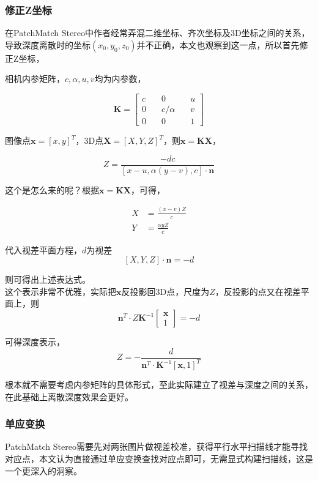 \subsubsection*{修正Z坐标}

在PatchMatch Stereo中作者经常弄混二维坐标、齐次坐标及3D坐标之间的关系，导致深度离散时的坐标$(x_0,y_0,z_0)$并不正确，本文也观察到这一点，所以首先修正Z坐标，

相机内参矩阵，$c,\alpha,u,v$均为内参数，

$$
	\mathbf{K} = \begin{bmatrix}
		c\quad& 0\quad& u\\
		0\quad& c/\alpha\quad& v\\
		0\quad& 0\quad& 1
	\end{bmatrix}
$$

图像点$\mathbf{x}=[x,y]^T$，3D点$\mathbf{X}=[X,Y,Z]^T$，则$\mathbf{x} = \mathbf{K}\mathbf{X}$，

$$
	Z = \frac{-dc}{[x-u,\alpha(y-v),c]\cdot\mathbf{n}}
$$

这个是怎么来的呢？根据$\mathbf{x} = \mathbf{K}\mathbf{X}$，可得，

\begin{align*}
	X &= \frac{(x-v)Z}{c}\\
	Y &= \frac{\alpha yZ}{c}
\end{align*}

代入视差平面方程，$d$为视差
$$
	[X,Y,Z]\cdot \mathbf{n} = -d
$$

则可得出上述表达式。\\

这个表示非常不优雅，实际把$\mathbf{x}$反投影回3D点，尺度为$Z$，反投影的点又在视差平面上，则
$$
	\mathbf{n}^T\cdot Z \mathbf{K}^{-1}\begin{bmatrix*}
		\mathbf{x}\\
		1
	\end{bmatrix*}=-d
$$

可得深度表示，
$$
	Z = -\frac{d}{\mathbf{n}^T\cdot \mathbf{K}^{-1}[\mathbf{x},1]^T}
$$

根本就不需要考虑内参矩阵的具体形式，至此实际建立了视差与深度之间的关系，在此基础上离散深度效果会更好。

\subsubsection*{单应变换}

PatchMatch Stereo需要先对两张图片做视差校准，获得平行水平扫描线才能寻找对应点，本文认为直接通过单应变换查找对应点即可，无需显式构建扫描线，这是一个更深入的洞察。

